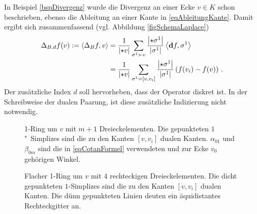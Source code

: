     In Beispiel \ref{bspDivergenz} wurde die Divergenz an einer Ecke \( v\in K \) schon beschrieben, ebenso die Ableitung an einer Kante in \eqref{eqAbleitungKante}.
    Damit ergibt sich zusammenfassend (vgl. Abbildung \ref{figSchemaLaplace})\\
    \begin{align}
    \label{eqDiskreteLaplace}
    \begin{aligned}
      \Delta_{B,d} f(v) :=
      \left\langle \Delta_{B} f, v \right\rangle 
          &= \frac{1}{\left| \star v \right|} \sum_{\sigma^{1}\succ v} \frac{\left| \star\sigma^{1} \right|}{\left| \sigma^{1} \right|}
                       \left\langle \mathbf{d} f , \sigma^{1} \right\rangle \\
          &= \frac{1}{\left| \star v \right|} \sum_{\sigma^{1}=\left[ v,v_{i} \right]} \frac{\left| \star\sigma^{1} \right|}{\left| \sigma^{1} \right|}
                       \left( f(v_{i}) - f(v) \right) \,\text{.}
    \end{aligned}
    \end{align}
    Der zusätzliche Index \( d \) soll hervorheben, dass der Operator diskret ist.
    In der Schreibweise der dualen Paarung, ist diese zusätzliche Indizierung nicht notwendig.

    \begin{figure}
      \begin{minipage}[t]{0.45\textwidth}
        \centering
        \caption[Schema für Laplace]{1-Ring um \( v \) mit \mbox{\( m+1 \)} Dreieckelementen.
                                     Die gepunkteten \( 1 \)"~Simplizes sind die zu den Kanten 
                                     \( \left[ v, v_{i} \right] \) dualen Kanten.
                                     \( \alpha_{01} \) und \( \beta_{0m} \) sind die in 
                                     \eqref{eqCotanFormel} verwendeten und zur Ecke \( v_{0} \) gehörigen Winkel.}
        \label{figSchemaLaplace}
      \end{minipage}
      \hfill
      \begin{minipage}[t]{0.45\textwidth}
        \centering
        \caption[5-Punkte-Stern]{Flacher 1-Ring um \( v \) mit \( 4 \) rechteckigen Dreieckelementen.
                                     Die dicht gepunkteten \( 1 \)-Simplizes sind die zu den Kanten 
                                     \( \left[ v, v_{i} \right] \) dualen Kanten.
                                     Die dünn gepunkteten Linien deuten ein äquidistantes Rechteckgitter an.}
        \label{fig5PunktStern}
      \end{minipage}
    \end{figure}

